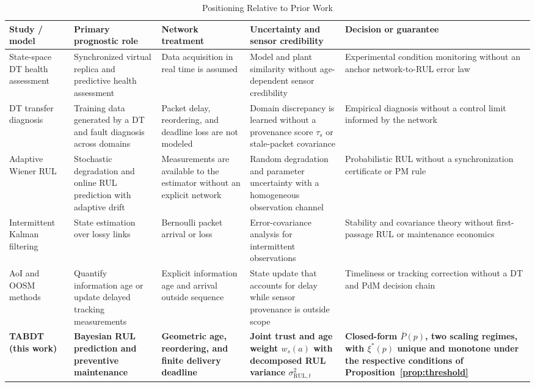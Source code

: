 \documentclass[journal]{IEEEtran}
\newcommand{\rul}{\mathrm{RUL}}
\newcommand{\Pb}{\bar{P}}
\begin{document}
\begin{table}[!t]
\centering
\caption{Positioning Relative to Prior Work}
\label{tab:related}
\scriptsize
\setlength{\tabcolsep}{2.7pt}
\renewcommand{\arraystretch}{0.96}
\begin{tabular}{>{\raggedright\arraybackslash}p{2.55cm}
                >{\raggedright\arraybackslash}p{3.35cm}
                >{\raggedright\arraybackslash}p{3.05cm}
                >{\raggedright\arraybackslash}p{3.55cm}
                >{\raggedright\arraybackslash}p{4.10cm}}
\toprule
Study / model & Primary prognostic role & Network treatment & Uncertainty and
sensor credibility & Decision or guarantee \\
\midrule
State-space DT health assessment~\cite{kumar2025ticps} & Synchronized virtual
replica and predictive health assessment & Data acquisition in real time is
assumed & Model and plant similarity without age-dependent sensor credibility &
Experimental condition monitoring without an anchor network-to-RUL error law \\
DT transfer diagnosis~\cite{samanazari2024ticps,feng2023ticps} &
Training data generated by a DT and fault diagnosis across domains & Packet delay,
reordering, and deadline loss are not modeled & Domain discrepancy is
learned without a provenance score $\tau_s$ or stale-packet covariance & Empirical
diagnosis without a control limit informed by the network \\
Adaptive Wiener RUL~\cite{zhai2017} & Stochastic degradation and online RUL
prediction with adaptive drift & Measurements are available to the estimator
without an explicit network & Random degradation and parameter uncertainty
with a homogeneous observation channel & Probabilistic RUL without a synchronization
certificate or PM rule \\
Intermittent Kalman filtering~\cite{sinopoli2004} & State
estimation over lossy links & Bernoulli packet arrival or loss & Error-covariance analysis for intermittent observations & Stability and covariance theory without
first-passage RUL or maintenance economics \\
AoI and OOSM methods~\cite{yates2021,barshalom2002} & Quantify information age
or update delayed tracking measurements & Explicit information age and
arrival outside sequence & State update that accounts for delay while sensor provenance is
outside scope & Timeliness or tracking correction without a DT and PdM decision chain \\
\textbf{TABDT (this work)} & \textbf{Bayesian RUL prediction and preventive
maintenance} & \textbf{Geometric age, reordering, and finite delivery
deadline} & \textbf{Joint trust and age weight $w_s(a)$ with decomposed RUL
variance $\sigma_{\rul,t}^2$} & \textbf{Closed-form $\Pb(p)$, two scaling
regimes, with $\xi^*(p)$ unique and monotone under the respective conditions
of Proposition~\ref{prop:threshold}} \\
\bottomrule
\end{tabular}
\end{table}
\end{document}
